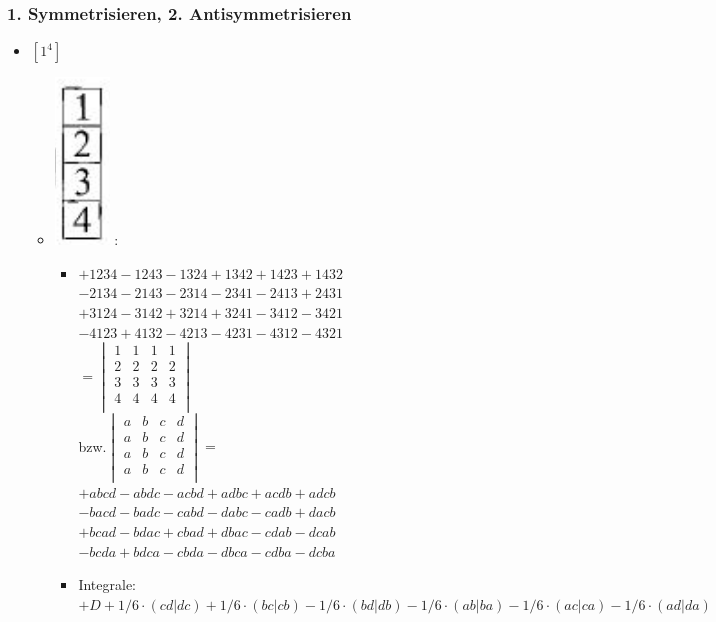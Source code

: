 \documentclass[12pt,a4paper]{article}
\newcommand{\h}[2]{\color{#1} #2 \color{black} }
\newcommand{\equalInM}[1]{\h{blue}{#1}} %
\begin{document}
 \subsubsection{1. Symmetrisieren, 2. Antisymmetrisieren}
\begin{itemize}
\item $\left[ 1 ^4\right]$ 
\begin{itemize}
\item \includegraphics[scale=0.4]{build/young-1hoch4.png} :
\begin{itemize}
\item \equalInM{$
+1234-1243-1324+1342
+1423+1432 $\\
$-2134-2143 -2314-2341-2413+2431$\\
$+3124-3142+3214+3241 -3412-3421$\\
$-4123+4132 -4213-4231-4312-4321$ \\
$ = \begin{vmatrix}
1 & 1 & 1 & 1 \\
2 & 2 & 2 & 2 \\
3 & 3 & 3 & 3 \\
4 & 4 & 4 & 4 \\
\end{vmatrix}$} \\
bzw.$\begin{vmatrix}
a & b & c & d \\
a & b & c & d \\
a & b & c & d \\
a & b & c & d \\
\end{vmatrix} =$\\
$+abcd-abdc-acbd+adbc+acdb+adcb$\\
$-bacd-badc -cabd-dabc-cadb+dacb$\\
$+bcad-bdac+cbad+dbac -cdab-dcab$\\
$-bcda+bdca -cbda-dbca-cdba-dcba$
\item Integrale: \\
$+ D + 1/6 \cdot (cd|dc) + 1/6 \cdot (bc|cb) - 1/6 \cdot (bd|db) - 1/6 \cdot (ab|ba) - 1/6 \cdot (ac|ca) - 1/6 \cdot (ad|da)$

\end{itemize}
\end{itemize}
\end{itemize}
\end{document}
